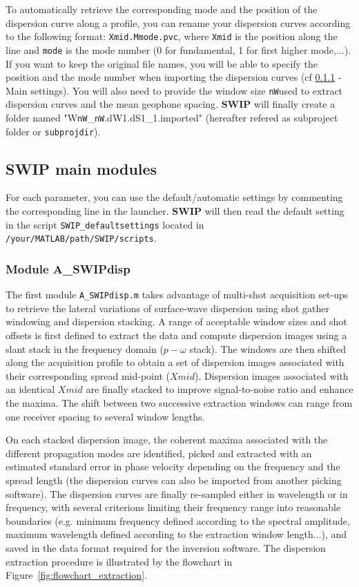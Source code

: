 \documentclass[twoside,a4paper]{article}
\def\SWIP{\textbf{SWIP}}
\begin{document}
To automatically retrieve the corresponding mode and the position of the dispersion curve along a profile, you can rename your dispersion curves according to the following format: \verb|Xmid.Mmode.pvc|, where \verb|Xmid| is the position along the line and \verb|mode| is the mode number (0 for fundamental, 1 for first higher mode,...). If you want to keep the original file names, you will be able to specify the position and the mode number when importing the dispersion curves (cf \ref{sec:moduleA} - Main settings). You will also need to provide the window size \verb|nW|used to extract dispersion curves and the mean geophone spacing. {\SWIP} will finally create a folder named "W\verb|nW|\_\verb|nW|.dW1.dS1\_1.imported" (hereafter refered as subproject folder or \verb|subprojdir|).

\subsection{SWIP main modules}
For each parameter, you can use the default/automatic settings by commenting the corresponding line in the launcher. {\SWIP} will then read the default setting in the script \verb|SWIP_defaultsettings| located in \verb|/your/MATLAB/path/SWIP/scripts|.

\subsubsection{Module A\_SWIPdisp}
\label{sec:moduleA}
The first module \verb|A_SWIPdisp.m| takes advantage of multi-shot acquisition set-ups to retrieve the lateral variations of surface-wave dispersion using shot gather windowing and dispersion stacking. A range of acceptable window sizes and shot offsets is first defined to extract the data and compute dispersion images using a slant stack in the frequency domain ($p-\omega$ stack). The windows are then shifted along the acquisition profile to obtain a set of dispersion images associated with their corresponding spread mid-point ($Xmid$). Dispersion images associated with an identical $Xmid$ are finally stacked to improve signal-to-noise ratio and enhance the maxima. The shift between two successive extraction windows can range from one receiver spacing to several window lengths.

On each stacked dispersion image, the coherent maxima associated with the different propagation modes are identified, picked and extracted with an estimated standard error in phase velocity depending on the frequency and the spread length (the dispersion curves can also be imported from another picking software). The dispersion curves are finally re-sampled either in wavelength or in frequency, with several criterions limiting their frequency range into reasonable boundaries (e.g. minimum frequency defined according to the spectral amplitude, maximum wavelength defined according to the extraction window length...), and saved in the data format required for the inversion software. The dispersion extraction procedure is illustrated by the flowchart in Figure~\ref{fig:flowchart_extraction}.
\end{document}
